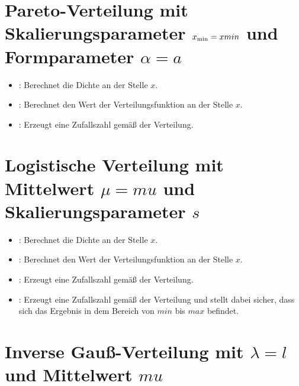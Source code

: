 \section{Pareto-Verteilung mit Skalierungsparameter \texorpdfstring{$x_{\rm min}=xmin$}{xmin} und Formparameter \texorpdfstring{$\alpha=a$}{a}}

\begin{itemize}

\item
{}:
Berechnet die Dichte an der Stelle $x$.

\item
{}:
Berechnet den Wert der Verteilungsfunktion an der Stelle $x$.

\item
{}:
Erzeugt eine Zufallszahl gemäß der Verteilung.

\end{itemize}



\section{Logistische Verteilung mit Mittelwert \texorpdfstring{$\mu=mu$}{mu} und Skalierungsparameter \texorpdfstring{$s$}{s}}

\begin{itemize}

\item
{}:
Berechnet die Dichte an der Stelle $x$.

\item
{}:
Berechnet den Wert der Verteilungsfunktion an der Stelle $x$.

\item
{}:
Erzeugt eine Zufallszahl gemäß der Verteilung.

\item
{}:
Erzeugt eine Zufallszahl gemäß der Verteilung und stellt dabei sicher, dass sich das Ergebnis in dem Bereich von $min$ bis $max$ befindet.

\end{itemize}


	
\section{Inverse Gauß-Verteilung mit \texorpdfstring{$\lambda=l$}{l} und Mittelwert \texorpdfstring{$mu$}{mu}}

